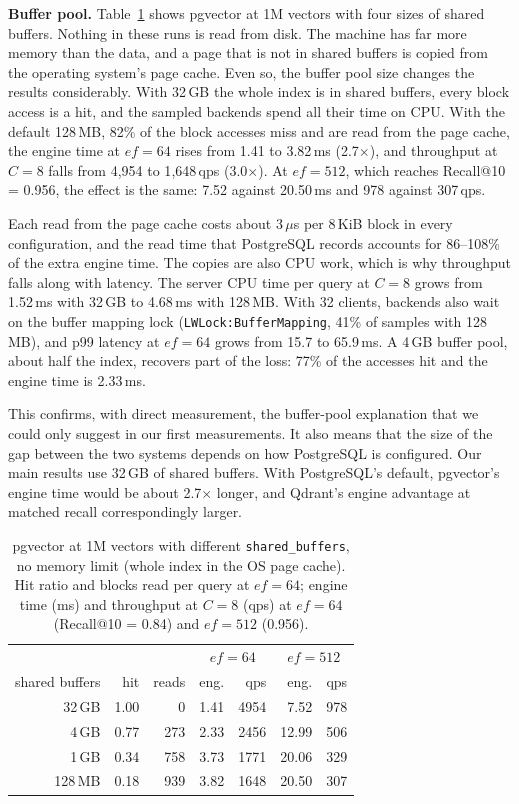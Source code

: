 \documentclass[preprint,12pt]{elsarticle}
\begin{document}
\textbf{Buffer pool.} Table~\ref{tab:sb} shows pgvector at 1M vectors with four sizes of
shared buffers. Nothing in these runs is read from disk. The machine has far more memory
than the data, and a page that is not in shared buffers is copied from the operating
system's page cache. Even so, the buffer pool size changes the results considerably.
With 32\,GB the whole index is in shared buffers, every block access is a hit, and the
sampled backends spend all their time on CPU. With the default 128\,MB, 82\% of the
block accesses miss and are read from the page cache, the engine time at $ef=64$ rises
from 1.41 to 3.82\,ms (2.7$\times$), and throughput at $C=8$ falls from 4{,}954 to
1{,}648\,qps (3.0$\times$). At $ef=512$, which reaches Recall@10 = 0.956, the effect is
the same: 7.52 against 20.50\,ms and 978 against 307\,qps.

Each read from the page cache costs about 3\,$\mu$s per 8\,KiB block in every
configuration, and the read time that PostgreSQL records accounts for 86--108\% of the
extra engine time. The copies are also CPU work, which is why throughput falls along
with latency. The server CPU time per query at $C=8$ grows from 1.52\,ms with 32\,GB to
4.68\,ms with 128\,MB. With 32 clients, backends also wait on the buffer mapping lock
(\texttt{LWLock:BufferMapping}, 41\% of samples with 128\,MB), and p99 latency at
$ef=64$ grows from 15.7 to 65.9\,ms. A 4\,GB buffer pool, about half the index, recovers
part of the loss: 77\% of the accesses hit and the engine time is 2.33\,ms.

This confirms, with direct measurement, the buffer-pool explanation that we could only
suggest in our first measurements. It also means that the size of the gap between the
two systems depends on how PostgreSQL is configured. Our main results use 32\,GB of
shared buffers. With PostgreSQL's default, pgvector's engine time would be about
2.7$\times$ longer, and Qdrant's engine advantage at matched recall correspondingly
larger.

\begin{table}[h]
  \caption{pgvector at 1M vectors with different \texttt{shared\_buffers}, no memory limit
  (whole index in the OS page cache). Hit ratio and blocks read per query at $ef=64$;
  engine time (ms) and throughput at $C=8$ (qps) at $ef=64$ (Recall@10 = 0.84) and
  $ef=512$ (0.956).}
  \label{tab:sb}
  \small
  \begin{tabular}{r|rr|rr|rr}
    \toprule
     & & & \multicolumn{2}{c|}{$ef=64$} & \multicolumn{2}{c}{$ef=512$} \\
    shared buffers & hit & reads & eng. & qps & eng. & qps \\
    \midrule
    32\,GB & 1.00 & 0 & 1.41 & 4954 & 7.52 & 978 \\
    4\,GB & 0.77 & 273 & 2.33 & 2456 & 12.99 & 506 \\
    1\,GB & 0.34 & 758 & 3.73 & 1771 & 20.06 & 329 \\
    128\,MB & 0.18 & 939 & 3.82 & 1648 & 20.50 & 307 \\
    \bottomrule
  \end{tabular}
\end{table}
\end{document}
